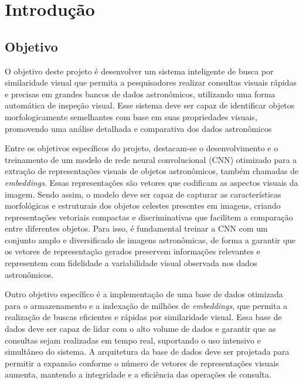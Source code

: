 \chapter{Introdução}
\label{cap:introducao}

\section{Objetivo}
\label{sec:objetivo}

O objetivo deste projeto é desenvolver um sistema inteligente de busca por similaridade visual que permita a pesquisadores realizar consultas visuais rápidas e precisas em grandes bancos de dados astronômicos, utilizando uma forma automática de inspeção visual. Esse sistema deve ser capaz de identificar objetos morfologicamente semelhantes com base em suas propriedades visuais, promovendo uma análise detalhada e comparativa dos dados astronômicos

Entre os objetivos específicos do projeto, destacam-se o desenvolvimento e o treinamento de um modelo de rede neural convolucional (CNN) otimizado para a extração de representações  visuais de objetos astronômicos, também chamadas de \emph{embeddings}. Essas representações são vetores que codificam as aspectos visuais da imagem. Sendo assim, o modelo deve ser capaz de capturar as características morfológicas e estruturais dos objetos celestes presentes em imagens, criando representações vetoriais compactas e discriminativas que facilitem a comparação entre diferentes objetos. Para isso, é fundamental treinar a CNN com um conjunto amplo e diversificado de imagens astronômicas, de forma a garantir que os vetores de representação gerados preservem informações relevantes e representem com fidelidade a variabilidade visual observada nos dados astronômicos.

Outro objetivo específico é a implementação de uma base de dados otimizada para o armazenamento e a indexação de milhões de \emph{embeddings}, que permita a realização de buscas eficientes e rápidas por similaridade visual. Essa base de dados deve ser capaz de lidar com o alto volume de dados e garantir que as consultas sejam realizadas em tempo real, suportando o uso intensivo e simultâneo do sistema. A arquitetura da base de dados deve ser projetada para permitir a expansão conforme o número de vetores de representações visuais aumenta, mantendo a integridade e a eficiência das operações de consulta.

